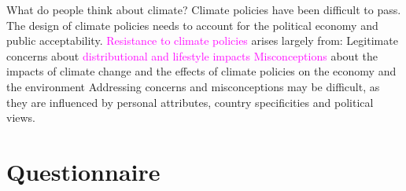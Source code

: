 \begin{frame}{What do people think about climate?}
\bbs
\ip Climate policies have been difficult to pass.
\ip The design of climate policies needs to account for the political economy and public acceptability.
\ip \textcolor{magenta}{Resistance to climate policies} arises largely from:
\bbs
\ip Legitimate concerns about \textcolor{magenta}{distributional and lifestyle impacts}
\ip \textcolor{magenta}{Misconceptions} about the impacts of climate change and the effects of climate policies on the economy and the environment
\ee 
\ip Addressing concerns and misconceptions may be difficult, as they are influenced by personal attributes, country specificities and political views.
\ee
\end{frame}

\section{Questionnaire}

